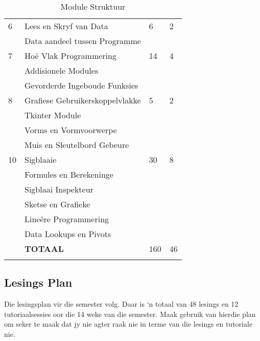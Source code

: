 \begin{longtable}{|p{2.0cm}|p{7.6cm}|p{2.0cm}|p{1.8cm}|}
             \hline
             6  & Lees en Skryf van Data                       &  6 & 2  \\
                & \qquad Data aandeel tussen Programme         &    &    \\
             \hline
             7  & Ho\"{e} Vlak Programmering                   & 14 & 4  \\
                & \qquad Addisionele Modules                   &    &    \\
                & \qquad Gevorderde Ingeboude Funksies         &    &    \\
             \hline
             8  & Grafiese Gebruikerskoppelvlakke              &  5 & 2  \\
                & \qquad Tkinter Module                        &    &    \\
                & \qquad Vorms en Vormvoorwerpe                &    &    \\
                & \qquad Muis en Sleutelbord Gebeure           &    &    \\
             \hline
             10 & Sigblaaie                                    & 30 & 8  \\
                & \qquad Formules en Berekeninge               &    &    \\
                & \qquad Sigblaai Inspekteur                   &    &    \\
                & \qquad Sketse en Grafieke                    &    &    \\
                & \qquad Line\^{e}re Programmering             &    &    \\
                & \qquad Data Lookups en Pivots                &    &    \\
             \hline
                & {\bf TOTAAL}                                 &160 & 46 \\
             \hline
            \caption[Module Struktuur]{Module Struktuur} \label{tab:study_comp}
        \end{longtable}

    \subsection{Lesings Plan}
        Die lesingsplan vir die semester volg. Daar is `n totaal van 48
        lesings en 12 tutoriaalsessies oor die 14 weke van die semester. Maak
        gebruik van hierdie plan om seker te maak dat jy nie agter raak nie in
        terme van die lesings en tutoriale nie.

